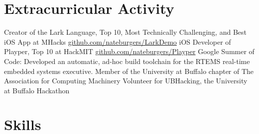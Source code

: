 \documentclass[11pt,a4paper,sans]{moderncv}
\begin{document}
\section{Extracurricular Activity}
 {Creator of the Lark Language, Top 10, Most Technically Challenging, and Best iOS App at MHacks \newline \url{github.com/nateburgers/LarkDemo}}
 {iOS Developer of Playper, Top 10 at HackMIT \newline \url{github.com/nateburgers/Playper}}
 {Google Summer of Code: Developed an automatic, ad-hoc build toolchain for the RTEMS real-time embedded systems executive.}
 {Member of the University at Buffalo chapter of The Association for Computing Machinery}
 {Volunteer for UBHacking, the University at Buffalo Hackathon}

\section{Skills}
\end{document}
